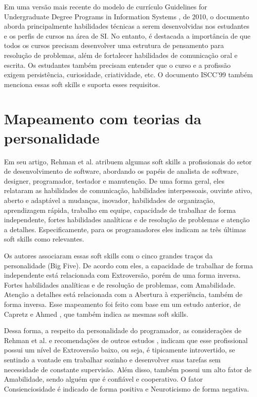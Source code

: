 Em uma versão mais recente do modelo de currículo Guidelines for Undergraduate Degree Programs in Information Systems \cite{is10}, de 2010, o documento aborda principalmente habilidades técnicas a serem desenvolvidas nos estudantes e os perfis de cursos na área de SI. No entanto, é destacada a importância de que todos os cursos precisam desenvolver uma estrutura de pensamento para resolução de problemas, além de fortalecer habilidades de comunicação oral e escrita. Os estudantes também precisam entender que o curso e a profissão exigem persistência, curiosidade, criatividade, etc. O documento ISCC'99 também menciona essas soft skills e suporta esses requisitos.

\section{Mapeamento com teorias da personalidade}
\label{sec:mapeamento}

Em seu artigo, Rehman et al. \cite{rehman:12} atribuem algumas soft skills a profissionais do setor de desenvolvimento de software, abordando os papéis de analista de software, designer, programador, testador e manutenção. De uma forma geral, eles relataram as habilidades de comunicação, habilidades interpessoais, ouvinte ativo, aberto e adaptável a mudanças, inovador, habilidades de organização, aprendizagem rápida, trabalho em equipe, capacidade de trabalhar de forma independente, fortes habilidades analíticas e de resolução de problemas e atenção a detalhes. Especificamente, para os programadores eles indicam as três últimas soft skills como relevantes.

Os autores associaram essas soft skills com o cinco grandes traços da personalidade (Big Five). De acordo com eles, a capacidade de trabalhar de forma independente está relacionada com Extroversão, porém de uma forma inversa. Fortes habilidades analíticas e de resolução de problemas, com Amabilidade. Atenção a detalhes está relacionada com a Abertura à experiência, também de forma inversa. Esse mapeamento foi feito com base em um estudo anterior, de Capretz e Ahmed \cite{capretz:10}, que também indica as mesmas soft skills.

Dessa forma, a respeito da personalidade do programador, as considerações de Rehman et al. \cite{rehman:12} e recomendações de outros estudos \cite{sodiya:07} \cite{martinez:11}, indicam que esse profissional possui um nível de Extroversão baixo, ou seja, é tipicamente introvertido, se sentindo a vontade em trabalhar sozinho e desenvolver suas tarefas sem necessidade de constante supervisão. Além disso, também possui um alto fator de Amabilidade, sendo alguém que é confiável e cooperativo. O fator Consienciosidade é indicado de forma positiva e Neuroticismo de forma negativa.

